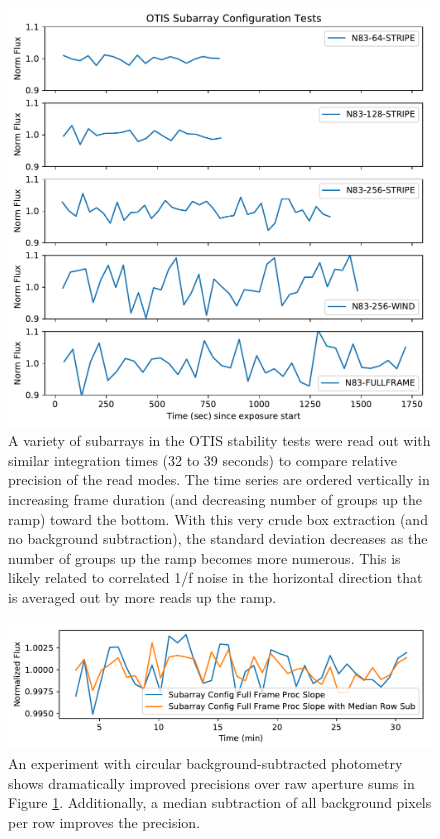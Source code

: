 \documentclass{aastex62}
\begin{document}
\begin{figure}[!hbtp]
\centering
\includegraphics[width=.5\columnwidth]{subarray_config_tser.pdf}
\caption{A variety of subarrays in the OTIS stability tests were read out with similar integration times (32 to 39 seconds) to compare relative precision of the read modes. 
The time series are ordered vertically in increasing frame duration (and decreasing number of groups up the ramp) toward the bottom.
With this very crude box extraction (and no background subtraction), the standard deviation decreases as the number of groups up the ramp becomes more numerous.
This is likely related to correlated 1/f noise in the horizontal direction that is averaged out by more reads up the ramp.}\label{fig:OTISsubarrays}
\end{figure}

\begin{figure}[!hbtp]
\centering
\includegraphics[width=.5\columnwidth]{fullframe_background_sub_compare_tser_tools.pdf}
\caption{An experiment with circular background-subtracted photometry shows dramatically improved precisions over raw aperture sums in Figure \ref{fig:OTISsubarrays}.
Additionally, a median subtraction of all background pixels per row improves the precision.}\label{fig:OTISSubConfigCircularAp}
\end{figure}
\end{document}
